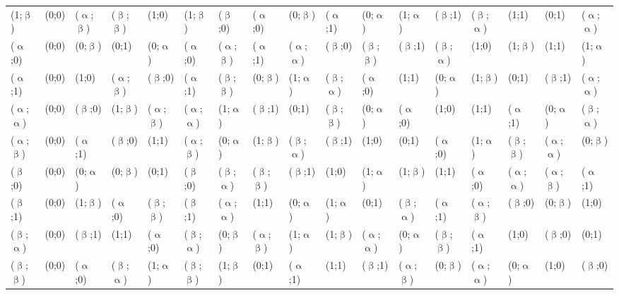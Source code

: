 \begin{table}
\begin{changemargin}{-2cm}{0cm}
\begin{tabular}{p{0.7cm}|p{0.5cm}p{0.5cm}p{0.5cm}p{0.5cm}p{0.5cm}p{0.5cm}p{0.5cm}p{0.5cm}p{0.5cm}p{0.5cm}p{0.5cm}p{0.5cm}p{0.5cm}p{0.5cm}p{0.5cm}p{0.5cm}}
(1;$\upbeta$) & (0;0) & ($\upalpha$;$\upbeta$) & ($\upbeta$;$\upbeta$) & (1;0) & (1;$\upbeta$) & ($\upbeta$;0) & ($\upalpha$;0) & (0;$\upbeta$) & ($\upalpha$;1) & (0;$\upalpha$) & (1;$\upalpha$) & ($\upbeta$;1) & ($\upbeta$;$\upalpha$) & (1;1) & (0;1) & ($\upalpha$;$\upalpha$) \\
($\upalpha$;0) & (0;0) & (0;$\upbeta$) & (0;1) & (0;$\upalpha$) & ($\upalpha$;0) & ($\upalpha$;$\upbeta$) & ($\upalpha$;1) & ($\upalpha$;$\upalpha$) & ($\upbeta$;0) & ($\upbeta$;$\upbeta$) & ($\upbeta$;1) & ($\upbeta$;$\upalpha$) & (1;0) & (1;$\upbeta$) & (1;1) & (1;$\upalpha$) \\
($\upalpha$;1) & (0;0) & (1;0) & ($\upalpha$;$\upbeta$) & ($\upbeta$;0) & ($\upalpha$;1) & ($\upbeta$;$\upbeta$) & (0;$\upbeta$) & (1;$\upalpha$) & ($\upbeta$;$\upalpha$) & ($\upalpha$;0) & (1;1) & (0;$\upalpha$) & (1;$\upbeta$) & (0;1) & ($\upbeta$;1) & ($\upalpha$;$\upalpha$) \\
($\upalpha$;$\upalpha$) & (0;0) & ($\upbeta$;0) & (1;$\upbeta$) & ($\upalpha$;$\upbeta$) & ($\upalpha$;$\upalpha$) & (1;$\upalpha$) & ($\upbeta$;1) & (0;1) & ($\upbeta$;$\upbeta$) & (0;$\upalpha$) & ($\upalpha$;0) & (1;0) & (1;1) & ($\upalpha$;1) & (0;$\upalpha$) & ($\upbeta$;$\upalpha$) \\
($\upalpha$;$\upbeta$) & (0;0) & ($\upalpha$;1) & ($\upbeta$;0) & (1;1) & ($\upalpha$;$\upbeta$) & (0;$\upalpha$) & (1;$\upbeta$) & ($\upbeta$;$\upalpha$) & ($\upbeta$;1) & (1;0) & (0;1) & ($\upalpha$;0) & (1;$\upalpha$) & ($\upbeta$;$\upbeta$) & ($\upalpha$;$\upalpha$) & (0;$\upbeta$) \\
($\upbeta$;0) & (0;0) & (0;$\upalpha$) & (0;$\upbeta$) & (0;1) & ($\upbeta$;0) & ($\upbeta$;$\upalpha$) & ($\upbeta$;$\upbeta$) & ($\upbeta$;1) & (1;0) & (1;$\upalpha$) & (1;$\upbeta$) & (1;1) & ($\upalpha$;0) & ($\upalpha$;$\upalpha$) & ($\upalpha$;$\upbeta$) & ($\upalpha$;1) \\
($\upbeta$;1) & (0;0) & (1;$\upbeta$) & ($\upalpha$;0) & ($\upbeta$;$\upbeta$) & ($\upbeta$;1) & ($\upalpha$;$\upalpha$) & (1;1) & (0;$\upalpha$) & (1;$\upalpha$) & (0;1) & ($\upbeta$;$\upalpha$) & ($\upalpha$;1) & ($\upalpha$;$\upbeta$) & ($\upbeta$;0) & (0;$\upbeta$) & (1;0) \\
($\upbeta$;$\upalpha$) & (0;0) & ($\upbeta$;1) & (1;1) & ($\upalpha$;0) & ($\upbeta$;$\upalpha$) & (0;$\upbeta$) & ($\upalpha$;$\upbeta$) & (1;$\upalpha$) & (1;$\upbeta$) & ($\upalpha$;$\upalpha$) & (0;$\upalpha$) & ($\upbeta$;$\upbeta$) & ($\upalpha$;1) & (1;0) & ($\upbeta$;0) & (0;1) \\
($\upbeta$;$\upbeta$) & (0;0) & ($\upalpha$;0) & ($\upbeta$;$\upalpha$) & (1;$\upalpha$) & ($\upbeta$;$\upbeta$) & (1;$\upbeta$) & (0;1) & ($\upalpha$;1) & (1;1) & ($\upbeta$;1) & ($\upalpha$;$\upbeta$) & (0;$\upbeta$) & ($\upalpha$;$\upalpha$) & (0;$\upalpha$) & (1;0) & ($\upbeta$;0)
\end{tabular}
\end{changemargin}
\end{table}

